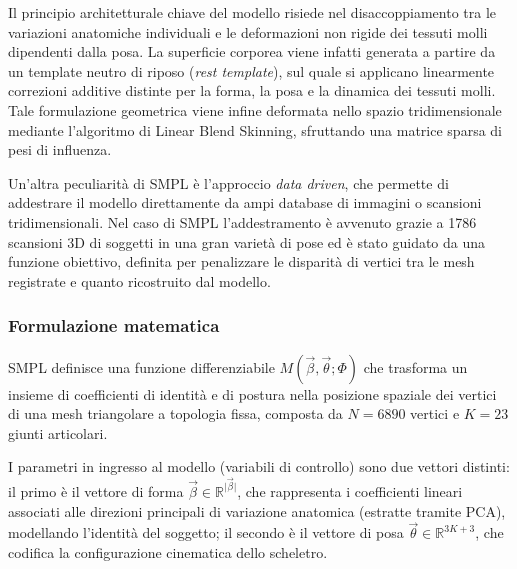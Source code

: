 Il principio architetturale chiave del modello risiede nel disaccoppiamento tra le variazioni anatomiche individuali e le deformazioni non rigide dei tessuti molli dipendenti dalla posa.
La superficie corporea viene infatti generata a partire da un template neutro di riposo (\emph{rest template}), sul quale si applicano linearmente correzioni additive distinte per la forma, la posa e la dinamica dei tessuti molli.
Tale formulazione geometrica viene infine deformata nello spazio tridimensionale mediante l'algoritmo di Linear Blend Skinning, sfruttando una matrice sparsa di pesi di influenza.

Un'altra peculiarità di SMPL è l'approccio \emph{data driven}, che permette di addestrare il modello direttamente da ampi database di immagini o scansioni tridimensionali.
Nel caso di SMPL l'addestramento è avvenuto grazie a 1786 scansioni 3D di soggetti in una gran varietà di pose ed è stato guidato da una funzione obiettivo, definita per penalizzare le disparità di vertici tra le mesh registrate e quanto ricostruito dal modello.

\subsubsection{Formulazione matematica}

SMPL definisce una funzione differenziabile $M(\vec{\beta}, \vec{\theta}; \Phi)$ che trasforma un insieme di coefficienti di identità e di postura nella posizione spaziale dei vertici di una mesh triangolare a topologia fissa, composta da $N = 6890$ vertici e $K = 23$ giunti articolari.

I parametri in ingresso al modello (variabili di controllo) sono due vettori distinti:
il primo è il vettore di forma $\vec{\beta} \in \mathbb{R}^{\vert{}\vec{\beta}\vert{}}$, che rappresenta i coefficienti lineari associati alle direzioni principali di variazione anatomica (estratte tramite PCA), modellando l'identità del soggetto;
il secondo è il vettore di posa $\vec{\theta} \in \mathbb{R}^{3K + 3}$, che codifica la configurazione cinematica dello scheletro.

